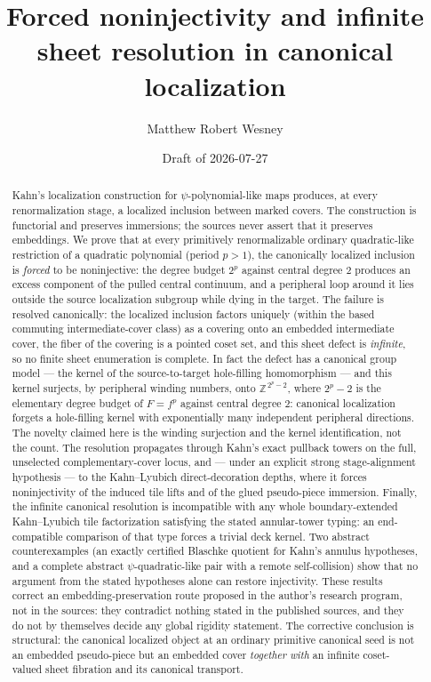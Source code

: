 \documentclass[11pt,reqno]{amsart}
\title[Forced noninjectivity in canonical localization]{Forced noninjectivity and infinite sheet resolution in canonical localization}
\author{Matthew Robert Wesney}
\date{Draft of 2026-07-27}
\theoremstyle{definition}
\theoremstyle{remark}
\begin{document}
\begin{abstract}
Kahn's localization construction for $\psi$-polynomial-like maps produces,
at every renormalization stage, a localized inclusion between marked
covers.  The construction is functorial and preserves immersions; the
sources never assert that it preserves embeddings.  We prove that at every
primitively renormalizable ordinary quadratic-like restriction of a
quadratic polynomial (period $p>1$),
the canonically localized inclusion is \emph{forced} to be noninjective:
the degree budget $2^{p}$ against central degree $2$ produces an excess
component of the pulled central continuum, and a peripheral loop around it
lies outside the source localization subgroup while dying in the target.
The failure is resolved canonically: the localized inclusion factors
uniquely (within the based commuting intermediate-cover class) as a
covering onto an embedded intermediate cover, the fiber of
the covering is a pointed coset set, and this sheet defect is
\emph{infinite}, so no finite sheet enumeration is complete.  In fact
the defect has a canonical group model --- the kernel of the
source-to-target hole-filling homomorphism --- and this kernel
surjects, by peripheral winding numbers, onto $\mathbb Z^{\,2^{p}-2}$,
where $2^{p}-2$ is the elementary degree budget of $F=f^{p}$ against
central degree $2$: canonical localization forgets a hole-filling
kernel with exponentially many independent peripheral directions.  The
novelty claimed here is the winding surjection and the kernel
identification, not the count.  The
resolution propagates through Kahn's exact pullback towers on the full,
unselected complementary-cover locus, and
--- under an explicit strong stage-alignment hypothesis --- to the Kahn--Lyubich
direct-decoration depths, where it forces noninjectivity of the induced
tile lifts and of the glued pseudo-piece immersion.  Finally, the infinite
canonical resolution is incompatible with any whole boundary-extended
Kahn--Lyubich tile factorization satisfying the stated annular-tower
typing: an end-compatible comparison of that type forces a
trivial deck kernel.  Two abstract counterexamples (an exactly certified
Blaschke quotient for Kahn's annulus hypotheses, and a complete abstract
$\psi$-quadratic-like pair with a remote self-collision) show that no
argument from the stated hypotheses alone can restore injectivity.  These
results correct an embedding-preservation route proposed in the author's
research program, not in the sources: they contradict
nothing stated in the published sources, and they do not by themselves
decide any global rigidity statement.  The corrective conclusion is
structural: the canonical localized object at an ordinary primitive
canonical seed is not an
embedded pseudo-piece but an embedded cover \emph{together with} an
infinite coset-valued sheet fibration and its canonical transport.
\end{abstract}
\end{document}
